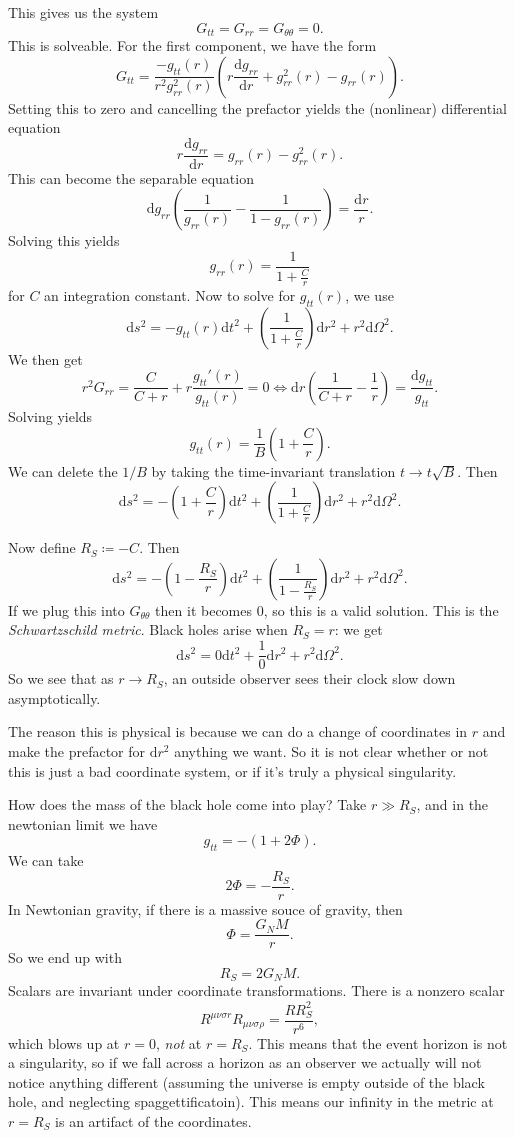 This gives us the system
\[
	G_{tt} =G_{rr} =G_{\theta \theta } =0
.\]
This is solveable. For the first component, we have the form
\[
	G_{tt} =\frac{-g_{tt} (r)}{r^2 g_{rr} ^2(r)} \left( r \frac{\mathrm{d}g_{rr} }{\mathrm{d}r} +g_{rr} ^2(r)-g_{rr} (r) \right) 
.\]
Setting this to zero and cancelling the prefactor yields the (nonlinear) differential equation
\[
	r \frac{\mathrm{d}g_{rr} }{\mathrm{d}r} =g_{rr} (r)-g_{rr} ^2(r)
.\]
This can become the separable equation
\[
	\mathrm{d} g_{rr} \left( \frac{1}{g_{rr} (r)} -\frac{1}{1-g_{rr} (r)}  \right) =\frac{\mathrm{d} r}{r} 
.\]
Solving this yields
\[
	g_{rr} (r)=\frac{1}{1+\frac{C}{r} } 
\]
for $C$ an integration constant. Now to solve for $g_{tt} (r)$, we use
\[
	\mathrm{d} s^2 = -g_{tt} (r)\mathrm{d} t^2+\left( \frac{1}{1+\frac{C}{r} }  \right) \mathrm{d} r^2+r^2 \mathrm{d} \Omega ^2
.\]
We then get
\[
	r^2 G_{rr} =\frac{C}{C+r} +r\frac{g_{tt} '(r)}{g_{tt} (r)} =0 \iff \mathrm{d} r\left( \frac{1}{C+r} -\frac{1}{r}  \right) =\frac{\mathrm{d}g_{tt} }{g_{tt} } 
.\]
Solving yields
\[
	g_{tt} (r)=\frac{1}{B} \left( 1+\frac{C}{r}  \right) 
.\]
We can delete the $1/B$ by taking the time-invariant translation $t\to t\sqrt{B} $. Then
\[
	\mathrm{d} s^2=-\left( 1+\frac{C}{r}  \right) \mathrm{d} t^2+\left( \frac{1}{1+\frac{C}{r} }  \right) \mathrm{d} r^2+r^2 \mathrm{d} \Omega ^2
.\]

Now define $R_S \coloneqq -C$. Then
\[
	\mathrm{d} s^2 = -\left( 1-\frac{R_S}{r}  \right) \mathrm{d} t^2 + \left( \frac{1}{1-\frac{R_S}{r} }  \right) \mathrm{d} r^2 + r^2 \mathrm{d} \Omega ^2
.\]
If we plug this into $G_{\theta \theta } $ then it becomes 0, so this is a valid solution. This is the \emph{Schwartzschild metric}. Black holes arise when $R_S=r$: we get
\[
	\mathrm{d} s^2= 0\mathrm{d} t^2+\frac{1}{0} \mathrm{d} r^2 + r^2 \mathrm{d} \Omega ^2
.\]
So we see that as $r\to R_S$, an outside observer sees their clock slow down asymptotically.

The reason this is physical is because we can do a change of coordinates in $r$ and make the prefactor for $\mathrm{d} r^2$ anything we want. So it is not clear whether or not this is just a bad coordinate system, or if it's truly a physical singularity.

How does the mass of the black hole come into play? Take $r\gg R_S$, and in the newtonian limit we have
\[
	g_{tt} =-\left( 1+2\Phi  \right) 
.\]
We can take
\[
	2\Phi =-\frac{R_S}{r} 
.\]
In Newtonian gravity, if there is a massive souce of gravity, then
\[
	\Phi =\frac{G_NM}{r} 
.\]
So we end up with
\[
	R_S=2G_NM
.\]
Scalars are invariant under coordinate transformations. There is a nonzero scalar
\[
	R^{\mu \nu \sigma r} R_{\mu \nu \sigma \rho } =\frac{RR_S^2}{r^6} ,
\]
which blows up at $r=0$, \emph{not} at $r=R_S$. This means that the event horizon is not a singularity, so if we fall across a horizon as an observer we actually will not notice anything different (assuming the universe is empty outside of the black hole, and neglecting spaggettificatoin). This means our infinity in the metric at $r=R_S$ is an artifact of the coordinates.

